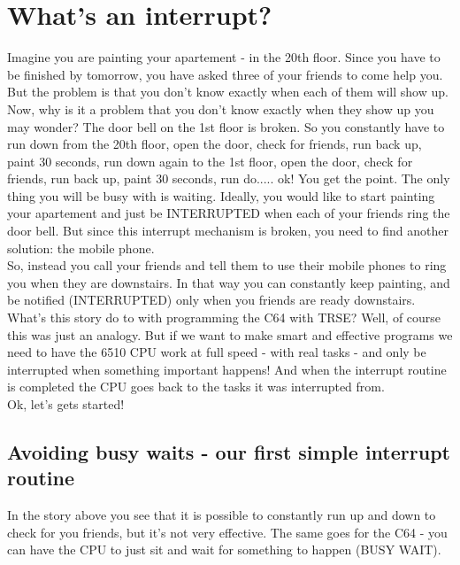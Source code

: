 \section{What's an interrupt?}
Imagine you are painting your apartement - in the 20th floor. Since you have to be finished by tomorrow, you have asked three of your friends to come help you. But the problem is that you don't know exactly when each of them will show up. 
\\
Now, why is it a problem that you don't know exactly when they show up you may wonder? The door bell on the 1st floor is broken. So you constantly have to run down from the 20th floor, open the door, check for friends, run back up, paint 30 seconds, run down again to the 1st floor, open the door, check for friends, run back up, paint 30 seconds, run do..... ok! You get the point. The only thing you will be busy with is waiting. Ideally, you would like to start painting your apartement and just be INTERRUPTED when each of your friends ring the door bell. But since this interrupt mechanism is broken, you need to find another solution: the mobile phone.
\\
So, instead you call your friends and tell them to use their mobile phones to ring you when they are downstairs. In that way you can constantly keep painting, and be notified (INTERRUPTED) only when you friends are ready downstairs.
\\
What's this story do to with programming the C64 with TRSE? Well, of course this was just an analogy. But if we want to make smart and effective programs we need to have the 6510 CPU work at full speed - with real tasks - and only be interrupted when something important happens! And when the interrupt routine is completed the CPU goes back to the tasks it was interrupted from.
\\
Ok, let's gets started! 
\\
\subsection{Avoiding busy waits - our first simple interrupt routine}
In the story above you see that it is possible to constantly run up and down to check for you friends, but it's not very effective. The same goes for the C64 - you can have the CPU to just sit and wait for something to happen (BUSY WAIT).  

